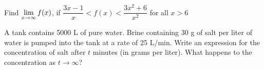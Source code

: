 \documentclass[notes]{subfiles}
\begin{document}
		\begin{ex}
			Find $\displaystyle \lim_{x\to \infty} f(x)$, if $\dfrac{3x - 1}{x} < f(x) < \dfrac{3x^2 + 6}{x^2}$ for all $x > 6$
		\end{ex}	

		\begin{ex}
			A tank contains 5000 L of pure water.  Brine containing 30 g of salt per liter of water is pumped into the tank at a rate of 25 L/min.  Write an expression for the concentration of salt after $t$ minutes (in grams per liter).  What happens to the concentration as $t\to\infty$?
		\end{ex}
	\clearpage
\end{document}
